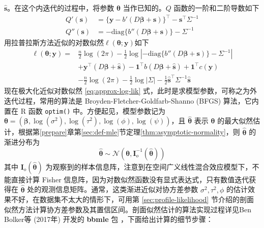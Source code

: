 \documentclass[12pt,a4paper,UTF8,twoside]{book}
\theoremstyle{definition}
\theoremstyle{definition}
\theoremstyle{definition}
\theoremstyle{remark}
\begin{document}
\(\hat{\mathbf{s}}\)。在这个内迭代的过程中，将参数
\(\boldsymbol{\theta}\) 当作已知的。\(Q\) 函数的一阶和二阶导数如下
\begin{align}
Q'(\mathbf{s})& =  \{\mathbf{y} - b'(D\boldsymbol{\beta} + \mathbf{s}) \}^{\top} - \mathbf{s}^{\top}\Sigma^{-1} \label{eq:first-deriv} \\
Q''(\mathbf{s})& =  -\mathrm{diag} \{b''(D\boldsymbol{\beta} + \mathbf{s}) \} - \Sigma^{-1} \label{eq:second-deriv}
\end{align}
\noindent 用拉普拉斯方法近似的对数似然\(\ell(\boldsymbol{\theta};\mathbf{y})\)如下
\begin{equation}
\begin{aligned}
\ell(\boldsymbol{\theta};\mathbf{y}) = {} & \frac{n}{2}\log (2\pi) -\frac{1}{2}\log | -\mathrm{diag} \{b''(D\boldsymbol{\beta} + \mathbf{s}) \} - \Sigma^{-1} |  \\
& + \mathbf{y}^{\top} (D\boldsymbol{\beta} + \hat{\mathbf{s}}) - \mathbf{1}^{\top} b( D\boldsymbol{\beta} + \hat{\mathbf{s}}) + \mathbf{1}^{\top} c(\mathbf{y}) \\
& - \frac{n}{2}\log (2\pi) -\frac{1}{2}\log |\Sigma| -\frac{1}{2}\hat{\mathbf{s}}^{\top} \Sigma^{-1} \hat{\mathbf{s}}
\end{aligned} \label{eq:approx-log-lik}
\end{equation} \noindent 现在极大化近似对数似然 \eqref{eq:approx-log-lik}
式，此时是求模型参数，可称之为外迭代过程，常用的算法是
Broyden-Fletcher-Goldfarb-Shanno (BFGS) 算法，它内置在 R 函数
\texttt{optim()} 中。方便起见，模型参数记为
\(\boldsymbol{\theta} = (\boldsymbol{\beta},\log(\sigma^2),\log(\tau^2),\log(\phi),\log(\psi))\)，且
\(\hat{\boldsymbol{\theta}}\) 表示 \(\boldsymbol{\theta}\)
的最大似然估计，根据第\ref{prepare}章第\ref{sec:def-mle}节定理\ref{thm:asymptotic-normality}，则
\(\hat{\boldsymbol{\theta}}\) 的渐进分布为
\[ \hat{\boldsymbol{\theta}} \sim \mathcal{N}(\boldsymbol{\theta}, \mathbf{I}_{o}^{-1}(\hat{\boldsymbol{\theta}})) \]
\noindent 其中 \(\mathbf{I}_{o}(\hat{\boldsymbol{\theta}})\)
为观察到的样本信息阵，注意到在空间广义线性混合效应模型下，不能直接计算
Fisher 信息阵，因为对数似然函数没有显式表达式，只有数值迭代获得在
\(\hat{\boldsymbol{\theta}}\)
处的观测信息矩阵。通常，这类渐进近似对协方差参数
\(\sigma^2, \tau^2, \phi\)
的估计效果不好，在数据集不太大的情形下，可用第
\ref{sec:profile-likelihood}
节介绍的剖面似然方法计算协方差参数及其置信区间。剖面似然估计的算法实现过程详见Ben
Bolker等 (2017年) 开发的 \textbf{bbmle} 包
\citep{R-bbmle}，下面给出计算的细节步骤：
\end{document}
